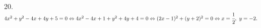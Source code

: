 20. $4x^2+y^2-4x+4y+5=0\Leftrightarrow4x^2-4x+1+y^2+4y+4=0\Leftrightarrow(2x-1)^2+(y+2)^2=0\Leftrightarrow x=\cfrac{1}{2},\ y=-2.$\\
